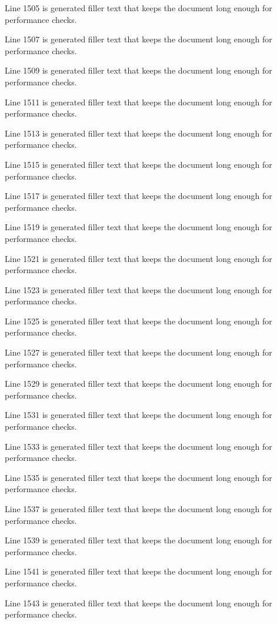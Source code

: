 Line 1505 is generated filler text that keeps the document long enough for performance checks.

Line 1507 is generated filler text that keeps the document long enough for performance checks.

Line 1509 is generated filler text that keeps the document long enough for performance checks.

Line 1511 is generated filler text that keeps the document long enough for performance checks.

Line 1513 is generated filler text that keeps the document long enough for performance checks.

Line 1515 is generated filler text that keeps the document long enough for performance checks.

Line 1517 is generated filler text that keeps the document long enough for performance checks.

Line 1519 is generated filler text that keeps the document long enough for performance checks.

Line 1521 is generated filler text that keeps the document long enough for performance checks.

Line 1523 is generated filler text that keeps the document long enough for performance checks.

Line 1525 is generated filler text that keeps the document long enough for performance checks.

Line 1527 is generated filler text that keeps the document long enough for performance checks.

Line 1529 is generated filler text that keeps the document long enough for performance checks.

Line 1531 is generated filler text that keeps the document long enough for performance checks.

Line 1533 is generated filler text that keeps the document long enough for performance checks.

Line 1535 is generated filler text that keeps the document long enough for performance checks.

Line 1537 is generated filler text that keeps the document long enough for performance checks.

Line 1539 is generated filler text that keeps the document long enough for performance checks.

Line 1541 is generated filler text that keeps the document long enough for performance checks.

Line 1543 is generated filler text that keeps the document long enough for performance checks.

